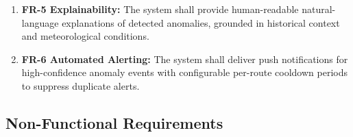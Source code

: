 \begin{enumerate}
      \item \textbf{FR-5 Explainability:} The system shall provide
      human-readable natural-language explanations of detected anomalies,                                                                                 
      grounded in historical context and meteorological conditions.                                                                               
                                                                                                                                                          
      \item \textbf{FR-6 Automated Alerting:} The system shall deliver                                                                                    
      push notifications for high-confidence anomaly events with configurable                                                                             
      per-route cooldown periods to suppress duplicate alerts.                                                                                            
  \end{enumerate}                                                                                                                                         
                                                                                                                                                          
  \subsection{Non-Functional Requirements}
  \label{subsec:nonfunctional_req}
   
